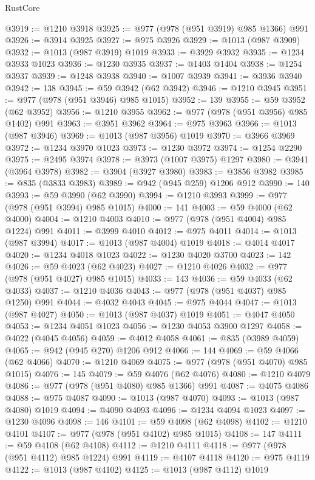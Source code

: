 \begin{lexlean}{RustCore}
\begin{coremodule}
@3919 := @1210 @3918
@3925 := @977 (@978 (@951 @3919) @985 @1366) @991
@3926 := @3914 @3925
@3927 := @975 @3926
@3929 := @1013 (@987 @3909)
@3932 := @1013 (@987 @3919) @1019
@3933 := @3929 @3932
@3935 := @1234 @3933 @1023
@3936 := @1230 @3935
@3937 := @1403 @1404
@3938 := @1254 @3937
@3939 := @1248 @3938
@3940 := @1007 @3939
@3941 := @3936 @3940
@3942 := 138
@3945 := @59 @3942 (@62 @3942)
@3946 := @1210 @3945
@3951 := @977 (@978 (@951 @3946) @985 @1015)
@3952 := 139
@3955 := @59 @3952 (@62 @3952)
@3956 := @1210 @3955
@3962 := @977 (@978 (@951 @3956) @985 @1402) @991
@3963 := @3951 @3962
@3964 := @975 @3963
@3966 := @1013 (@987 @3946)
@3969 := @1013 (@987 @3956) @1019
@3970 := @3966 @3969
@3972 := @1234 @3970 @1023
@3973 := @1230 @3972
@3974 := @1254 @2290
@3975 := @2495 @3974
@3978 := @3973 (@1007 @3975) @1297
@3980 := @3941 (@3964 @3978)
@3982 := @3904 (@3927 @3980)
@3983 := @3856 @3982
@3985 := @835 (@3833 @3983)
@3989 := @942 (@945 @259) @1206 @912
@3990 := 140
@3993 := @59 @3990 (@62 @3990)
@3994 := @1210 @3993
@3999 := @977 (@978 (@951 @3994) @985 @1015)
@4000 := 141
@4003 := @59 @4000 (@62 @4000)
@4004 := @1210 @4003
@4010 := @977 (@978 (@951 @4004) @985 @1224) @991
@4011 := @3999 @4010
@4012 := @975 @4011
@4014 := @1013 (@987 @3994)
@4017 := @1013 (@987 @4004) @1019
@4018 := @4014 @4017
@4020 := @1234 @4018 @1023
@4022 := @1230 @4020 @3700
@4023 := 142
@4026 := @59 @4023 (@62 @4023)
@4027 := @1210 @4026
@4032 := @977 (@978 (@951 @4027) @985 @1015)
@4033 := 143
@4036 := @59 @4033 (@62 @4033)
@4037 := @1210 @4036
@4043 := @977 (@978 (@951 @4037) @985 @1250) @991
@4044 := @4032 @4043
@4045 := @975 @4044
@4047 := @1013 (@987 @4027)
@4050 := @1013 (@987 @4037) @1019
@4051 := @4047 @4050
@4053 := @1234 @4051 @1023
@4056 := @1230 @4053 @3900 @1297
@4058 := @4022 (@4045 @4056)
@4059 := @4012 @4058
@4061 := @835 (@3989 @4059)
@4065 := @942 (@945 @270) @1206 @912
@4066 := 144
@4069 := @59 @4066 (@62 @4066)
@4070 := @1210 @4069
@4075 := @977 (@978 (@951 @4070) @985 @1015)
@4076 := 145
@4079 := @59 @4076 (@62 @4076)
@4080 := @1210 @4079
@4086 := @977 (@978 (@951 @4080) @985 @1366) @991
@4087 := @4075 @4086
@4088 := @975 @4087
@4090 := @1013 (@987 @4070)
@4093 := @1013 (@987 @4080) @1019
@4094 := @4090 @4093
@4096 := @1234 @4094 @1023
@4097 := @1230 @4096
@4098 := 146
@4101 := @59 @4098 (@62 @4098)
@4102 := @1210 @4101
@4107 := @977 (@978 (@951 @4102) @985 @1015)
@4108 := 147
@4111 := @59 @4108 (@62 @4108)
@4112 := @1210 @4111
@4118 := @977 (@978 (@951 @4112) @985 @1224) @991
@4119 := @4107 @4118
@4120 := @975 @4119
@4122 := @1013 (@987 @4102)
@4125 := @1013 (@987 @4112) @1019

\end{coremodule}
\end{lexlean}
